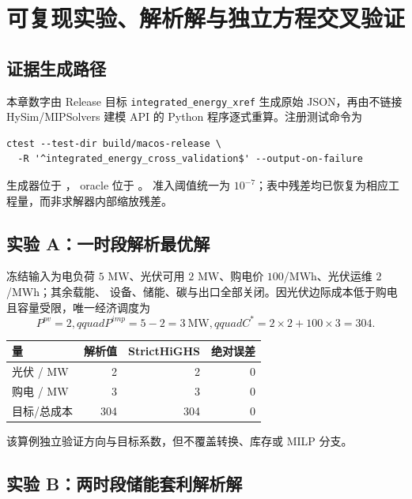 \section{可复现实验、解析解与独立方程交叉验证}

\subsection{证据生成路径}

本章数字由 Release 目标 \texttt{integrated\_energy\_xref} 生成原始 JSON，再由不链接 HySim/MIPSolvers
建模 API 的 Python 程序逐式重算。注册测试命令为
\begin{verbatim}
ctest --test-dir build/macos-release \
  -R '^integrated_energy_cross_validation$' --output-on-failure
\end{verbatim}
生成器位于
，
oracle 位于
。
准入阈值统一为 $10^{-7}$；表中残差均已恢复为相应工程量，而非求解器内部缩放残差。

\subsection{实验 A：一时段解析最优解}

冻结输入为电负荷 $5$ MW、光伏可用 $2$ MW、购电价 $100$/MWh、光伏运维 $2$/MWh；其余载能、
设备、储能、碳与出口全部关闭。因光伏边际成本低于购电且容量受限，唯一经济调度为
\begin{equation}
 P^{pv}=2,qquad P^{imp}=5-2=3\ \text{MW},qquad
 C^*=2\times2+100\times3=304.
\end{equation}

\begin{center}\small
\begin{tabular}{@{}lrrr@{}}\toprule
量 & 解析值 & StrictHiGHS & 绝对误差\\\midrule
光伏 / MW & 2 & 2 & $0$\\
购电 / MW & 3 & 3 & $0$\\
目标/总成本 & 304 & 304 & $0$\\\bottomrule
\end{tabular}
\end{center}

该算例独立验证方向与目标系数，但不覆盖转换、库存或 MILP 分支。

\subsection{实验 B：两时段储能套利解析解}

